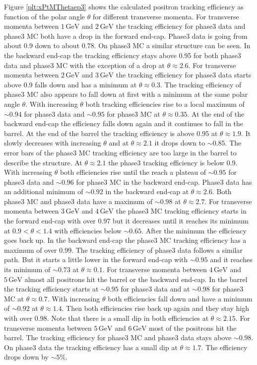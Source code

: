 \documentclass[a4paper,11pt,twosided,final,german,openbib,pdftex,listof=totoc,bibliography=totoc]{scrbook}
\begin{document}
Figure \ref{plt:xPtMThetaep3} shows the calculated positron tracking efficiency as function of the polar angle $\theta$ for different transverse momenta.
For transverse momenta between $1\,\textrm{GeV}$ and $2\,\textrm{GeV}$ the tracking efficiency for phase3 data and phase3 MC both have a drop in the forward end-cap. Phase3 data is going from about 0.9 down to about 0.78. On phase3 MC a similar structure can be seen. In the backward end-cap the tracking efficiency stays above 0.95 for both phase3 data and phase3 MC with the exception of a drop at $\theta \approx 2.6$.
For transverse momenta between $2\,\textrm{GeV}$ and $3\,\textrm{GeV}$ the tracking efficiency for phase3 data starts above 0.9 falls down and has a minimum at $\theta \approx 0.3$. The tracking efficiency of phase3 MC also appears to fall down at first with a minimum at the same polar angle $\theta$. With increasing $\theta$ both tracking efficiencies rise to a local maximum of $\sim 0.94$ for phase3 data and $\sim 0.95$ for phase3 MC at $\theta \approx 0.35$. At the end of the backward end-cap the efficiency falls down again and it continues to fall in the barrel. At the end of the barrel the tracking efficiency is above 0.95 at $\theta \approx 1.9$. It slowly decreases with increasing $\theta$ and at $\theta \approx 2.1$ it drops down to $\sim 0.85$. The error bars of the phase3 MC tracking efficiency are too large in the barrel to describe the structure. At $\theta \approx 2.1$ the phase3 tracking efficiency is below 0.9. With increasing $\theta$ both efficiencies rise until the reach a plateau of $\sim 0.95$ for phase3 data and $\sim 0.96$ for phase3 MC in the backward end-cap. Phase3 data has an additional minimum of $\sim 0.92$ in the backward end-cap at $\theta \approx 2.6$. Both phase3 MC and phase3 data have a maximum of $\sim 0.98$ at $\theta \approx 2.7$.
For transverse momenta between $3\,\textrm{GeV}$ and $4\,\textrm{GeV}$ the phase3 MC tracking efficiency starts in the forward end-cap with over 0.97 but it decreases until it reaches its minimum at $0.9 < \theta < 1.4$ with efficiencies below $\sim 0.65$. After the minimum the efficiency goes back up. In the backward end-cap the phase3 MC tracking efficiency has a maximum of over 0.99. The tracking efficiency of phase3 data follows a similar path. But it starts a little lower in the forward end-cap with $\sim 0.95$ and it reaches its minimum of $\sim 0.73$ at $\theta \approx 0.1$.
For transverse momenta between $4\,\textrm{GeV}$ and $5\,\textrm{GeV}$ almost all positrons hit the barrel or the backward end-cap. In the barrel the tracking efficiency starts at $\sim 0.95$ for phase3 data and at $\sim 0.98$ for phase3 MC at $\theta \approx 0.7$. With increasing $\theta$ both efficiencies fall down and have a minimum of $\sim 0.92$ at $\theta \approx 1.4$. Then both efficiencies rise back up again and they stay high with over 0.98. Note that there is a small dip in both efficiencies at $\theta \approx 2.15$.
For transverse momenta between $5\,\textrm{GeV}$ and $6\,\textrm{GeV}$ most of the positrons hit the barrel. The tracking efficiency for phase3 MC and phase3 data stays above $\sim 0.98$. On phase3 data the tracking efficiency has a small dip at $\theta \approx 1.7$. The efficiency drops down by $\sim 5\%$.
\end{document}
